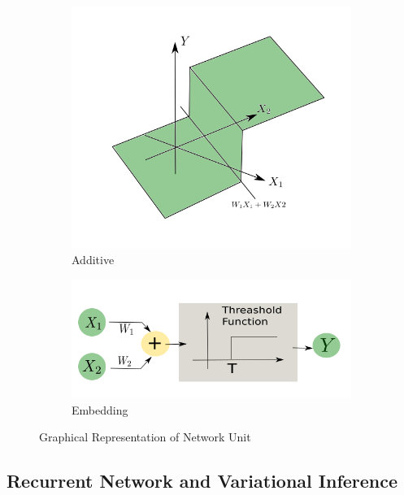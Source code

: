 \documentclass[journal]{IEEEtran}
\begin{document}
\begin{figure}[H]
\centering
\begin{subfigure}{0.25\textwidth}
  \centering
  \includegraphics[width=\linewidth]{network1.png}
  \caption{Additive}
\end{subfigure}%
\begin{subfigure}{.25\textwidth}
  \centering
  \includegraphics[width=\linewidth]{network2.png}
  \caption{Embedding}
\end{subfigure}
\caption{Graphical Representation of Network Unit}
\label{fig:combine}
\end{figure}












\subsection{Recurrent Network and Variational Inference}
\end{document}

